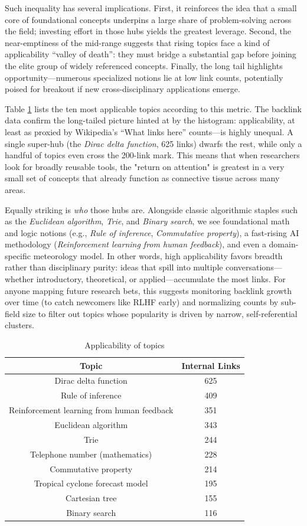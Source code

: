 Such inequality has several implications. First, it reinforces the idea that a small core of foundational concepts underpins a large share of problem-solving across the field; investing effort in those hubs yields the greatest leverage. Second, the near-emptiness of the mid-range suggests that rising topics face a kind of applicability “valley of death”: they must bridge a substantial gap before joining the elite group of widely referenced concepts. Finally, the long tail highlights opportunity—numerous specialized notions lie at low link counts, potentially poised for breakout if new cross-disciplinary applications emerge.

Table \ref{tab:Applicability-of-Topics} lists the ten most applicable topics according to this metric. The backlink data confirm the long-tailed picture hinted at by the histogram: applicability, at least as proxied by Wikipedia's “What links here” counts—is highly unequal. A single super-hub (the \emph{Dirac delta function}, 625 links) dwarfs the rest, while only a handful of topics even cross the 200-link mark. This means that when researchers look for broadly reusable tools, the "return on attention" is greatest in a very small set of concepts that already function as connective tissue across many areas.

Equally striking is \emph{who} those hubs are. Alongside classic algorithmic staples such as the \emph{Euclidean algorithm}, \emph{Trie}, and \emph{Binary search}, we see foundational math and logic notions (e.g., \emph{Rule of inference}, \emph{Commutative property}), a fast-rising AI methodology (\emph{Reinforcement learning from human feedback}), and even a domain-specific meteorology model. In other words, high applicability favors breadth rather than disciplinary purity: ideas that spill into multiple conversations—whether introductory, theoretical, or applied—accumulate the most links. For anyone mapping future research bets, this suggests monitoring backlink growth over time (to catch newcomers like RLHF early) and normalizing counts by sub-field size to filter out topics whose popularity is driven by narrow, self-referential clusters.

\begin{table}
\begin{centering}
\begin{tabular}{|c|c|}
\hline 
Topic & Internal Links \tabularnewline
\hline
\hline
Dirac delta function & 625\tabularnewline
\hline
Rule of inference & 409\tabularnewline
\hline
Reinforcement learning from human feedback & 351\tabularnewline
\hline
Euclidean algorithm & 343\tabularnewline
\hline
Trie & 244\tabularnewline
\hline
Telephone number (mathematics) & 228\tabularnewline
\hline
Commutative property & 214\tabularnewline
\hline
Tropical cyclone forecast model & 195\tabularnewline
\hline
Cartesian tree & 155\tabularnewline
\hline
Binary search & 116\tabularnewline
\hline 
\end{tabular}
\par\end{centering}
\caption{\label{tab:Applicability-of-Topics}Applicability of topics}
\end{table}

